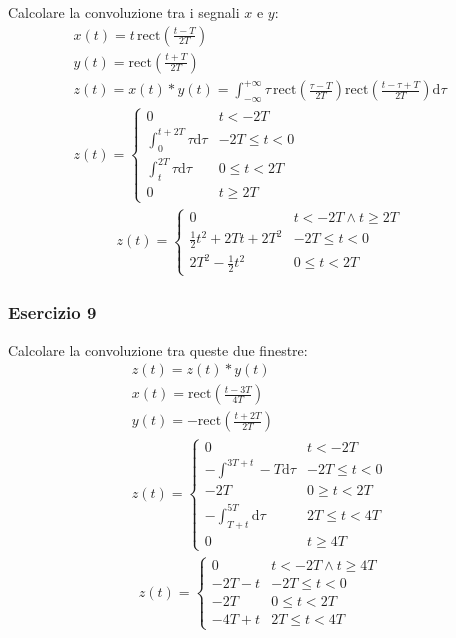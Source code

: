 \documentclass{article}
\newcommand{\rect}{\mathrm{rect}}
\newcommand{\df}{\mathrm{d}}
\begin{document}
Calcolare la convoluzione tra i segnali $x$ e $y$:
\begin{gather*}
    x(t)=\displaystyle t\,\rect\left(\frac{t-T}{2T}\right)\\
    y(t)=\displaystyle\rect\left(\frac{t+T}{2T}\right)\\
    z(t)=x(t)*y(t)=\displaystyle\int_{-\infty}^{+\infty}\tau\,\rect\left(\frac{\tau-T}{2T}\right)\rect\left(\frac{t-\tau+T}{2T}\right)\df\tau\\
    z(t)=\begin{cases}
        0&t<-2T\\
        \displaystyle\int_{0}^{t+2T}\tau \df\tau&-2T\leq t<0\\
        \displaystyle\int_{t}^{2T}\tau \df\tau&0\leq t<2T\\
        0&t\geq2T
    \end{cases}
\end{gather*}
\begin{gather}
    z(t)=\begin{cases}
        0&t<-2T\land t\geq2T\\
        \displaystyle\frac{1}{2}t^2+2Tt+2T^2&-2T\leq t<0\\
        \displaystyle2T^2-\frac{1}{2}t^2&0\leq t<2T
    \end{cases}
\end{gather}

\subsubsection*{Esercizio 9}

Calcolare la convoluzione tra queste due finestre:
\begin{gather*}
    z(t)=z(t)*y(t)\\
    x(t)=\displaystyle\rect\left(\frac{t-3T}{4T}\right)\\
    y(t)=-\displaystyle\rect\left(\frac{t+2T}{2T}\right)\\
    z(t)=\begin{cases}
        0&t<-2T\\
        -\displaystyle\int^{3T+t}-{T}\df\tau&-2T\leq t<0\\
        -2T&0\geq t<2T\\
        -\displaystyle\int_{T+t}^{5T}\df\tau&2T\leq t<4T\\
        0&t\geq 4T
    \end{cases}
\end{gather*}
\begin{gather}
    z(t)=\begin{cases}
        0&t<-2T \land t\geq 4T\\
        -2T-t&-2T\leq t<0\\
        -2T&0\leq t<2T\\
        -4T+t&2T\leq t<4T
    \end{cases}
\end{gather}
\end{document}
